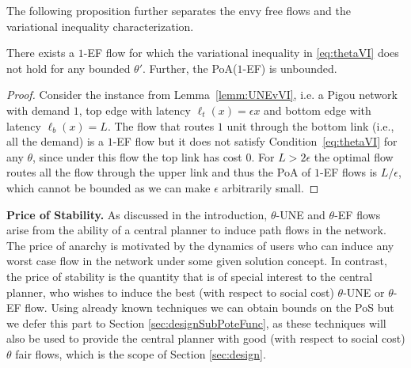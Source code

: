 The following proposition further separates the envy free flows and the variational inequality characterization. 
\begin{proposition}
There exists a $1$-EF flow for which the variational inequality in \eqref{eq:thetaVI} does not hold for any bounded $\theta'$. Further, the PoA($1$-EF) is unbounded.
\end{proposition}
\begin{proof}
Consider the instance from Lemma~\ref{lemm:UNEvVI}, i.e. a Pigou network with demand $1$, top edge with latency $\ell_t(x) = \epsilon x$ and bottom edge with latency $\ell_b(x) = L$. The flow that routes $1$ unit through the bottom link (i.e., all the demand) is a $1$-EF flow but it does not satisfy Condition~\eqref{eq:thetaVI} for  any $\theta$, since under this flow the top link has cost 0.
For $L>2\epsilon$ the optimal flow routes all the flow through the upper link and thus the PoA of $1$-EF flows is $L/\epsilon$, which cannot be bounded as we can make $\epsilon$ arbitrarily small.
\end{proof}

\textbf{Price of Stability.} As discussed in the introduction, $\theta$-UNE and $\theta$-EF flows arise from the ability of a central planner to induce path flows in the network. The price of anarchy is motivated by the dynamics of users who can induce any worst case flow in the network under some given solution concept. In contrast, the price of stability is the quantity that is of special interest to the central planner, who wishes to induce the best (with respect to social cost) $\theta$-UNE or $\theta$-EF flow. Using already known techniques we can obtain bounds on the PoS but we defer this part to Section \ref{sec:designSubPoteFunc}, as these techniques will also be used to provide the central planner with good (with respect to social cost) $\theta$ fair flows, which is the scope of Section \ref{sec:design}.

